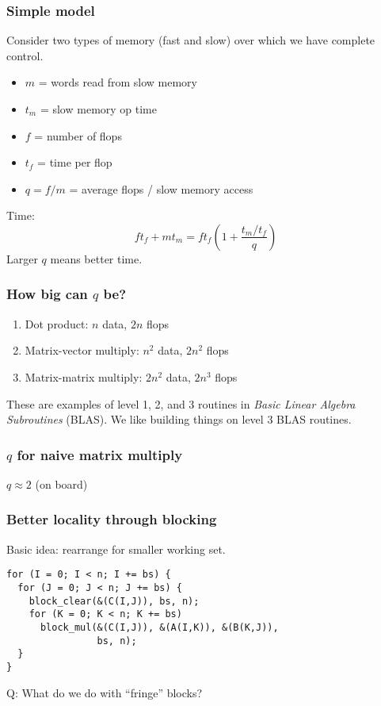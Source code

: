 \documentclass{beamer}
\begin{document}
\begin{frame}
  \frametitle{Simple model}

  Consider two types of memory (fast and slow) over which we have
  complete control.
  \begin{itemize}
  \item $m$ = words read from slow memory
  \item $t_m$ = slow memory op time
  \item $f$ = number of flops
  \item $t_f$ = time per flop
  \item $q = f/m$ = average flops / slow memory access
  \end{itemize}
  Time:
  \[
    f t_f + m t_m = f t_f \left( 1 + \frac{t_m/t_f}{q} \right)
  \]
  Larger $q$ means better time.
\end{frame}


\begin{frame}
  \frametitle{How big can $q$ be?}

  \begin{enumerate}
  \item Dot product: $n$ data, $2n$ flops
  \item Matrix-vector multiply: $n^2$ data, $2n^2$ flops
  \item Matrix-matrix multiply: $2n^2$ data, $2n^3$ flops
  \end{enumerate}
  These are examples of level 1, 2, and 3 routines in
  {\em Basic Linear Algebra Subroutines} (BLAS).
  We like building things on level 3 BLAS routines.

\end{frame}


\begin{frame}
  \frametitle{$q$ for naive matrix multiply}

  $q \approx 2$ (on board)
\end{frame}

\begin{frame}[fragile]
  \frametitle{Better locality through blocking}

  Basic idea: rearrange for smaller working set.
\begin{verbatim}
for (I = 0; I < n; I += bs) {
  for (J = 0; J < n; J += bs) {
    block_clear(&(C(I,J)), bs, n);
    for (K = 0; K < n; K += bs)
      block_mul(&(C(I,J)), &(A(I,K)), &(B(K,J)), 
                bs, n);
  }
}
\end{verbatim}
  Q: What do we do with ``fringe'' blocks?

\end{frame}
\end{document}
